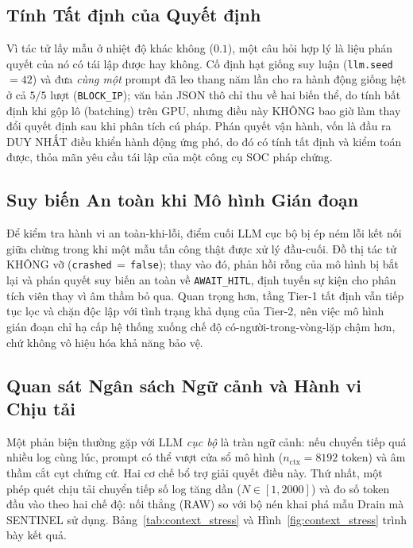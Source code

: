 \subsection{Tính Tất định của Quyết định}
Vì tác tử lấy mẫu ở nhiệt độ khác không ($0.1$), một câu hỏi hợp lý là liệu phán quyết của nó có tái lập được hay không. Cố định hạt giống suy luận (\texttt{llm.seed}\,$=42$) và đưa \emph{cùng một} prompt đã leo thang năm lần cho ra hành động giống hệt ở cả $5/5$ lượt (\texttt{BLOCK\_IP}); văn bản JSON thô chỉ thu về hai biến thể, do tính bất định khi gộp lô (batching) trên GPU, nhưng điều này KHÔNG bao giờ làm thay đổi quyết định sau khi phân tích cú pháp. Phán quyết vận hành, vốn là đầu ra DUY NHẤT điều khiển hành động ứng phó, do đó có tính tất định và kiểm toán được, thỏa mãn yêu cầu tái lập của một công cụ SOC pháp chứng.

\subsection{Suy biến An toàn khi Mô hình Gián đoạn}
Để kiểm tra hành vi an toàn-khi-lỗi, điểm cuối LLM cục bộ bị ép ném lỗi kết nối giữa chừng trong khi một mẫu tấn công thật được xử lý đầu-cuối. Đồ thị tác tử KHÔNG vỡ (\texttt{crashed}\,$=$\,\texttt{false}); thay vào đó, phản hồi rỗng của mô hình bị bắt lại và phán quyết suy biến an toàn về \texttt{AWAIT\_HITL}, định tuyến sự kiện cho phân tích viên thay vì âm thầm bỏ qua. Quan trọng hơn, tầng Tier-1 tất định vẫn tiếp tục lọc và chặn độc lập với tình trạng khả dụng của Tier-2, nên việc mô hình gián đoạn chỉ hạ cấp hệ thống xuống chế độ có-người-trong-vòng-lặp chậm hơn, chứ không vô hiệu hóa khả năng bảo vệ.

\subsection{Quan sát Ngân sách Ngữ cảnh và Hành vi Chịu tải}
Một phản biện thường gặp với LLM \emph{cục bộ} là tràn ngữ cảnh: nếu chuyển tiếp quá nhiều log cùng lúc, prompt có thể vượt cửa sổ mô hình ($n_{\text{ctx}} = 8192$ token) và âm thầm cắt cụt chứng cứ. Hai cơ chế bổ trợ giải quyết điều này. Thứ nhất, một phép quét chịu tải chuyển tiếp số log tăng dần ($N \in [1, 2000]$) và đo số token đầu vào theo hai chế độ: nối thẳng (RAW) so với bộ nén khai phá mẫu Drain mà SENTINEL sử dụng. Bảng~\ref{tab:context_stress} và Hình~\ref{fig:context_stress} trình bày kết quả.

